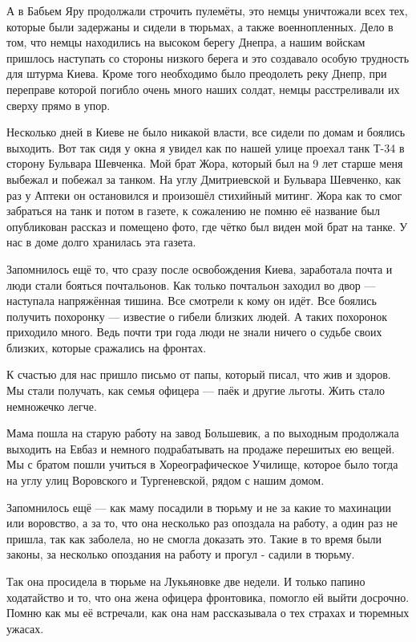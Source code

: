 А в Бабьем Яру продолжали строчить пулемёты, это немцы уничтожали всех тех,
которые были задержаны и сидели в тюрьмах, а также военнопленных.  Дело в том,
что немцы находились на высоком берегу Днепра, а нашим войскам пришлось
наступать со стороны низкого берега и это создавало особую трудность для штурма
Киева. Кроме того необходимо было преодолеть  реку Днепр, при переправе которой
погибло очень много наших солдат, немцы расстреливали их сверху прямо в упор.  

Несколько дней в Киеве не  было никакой власти, все сидели по домам и боялись
выходить.  Вот так сидя у окна я увидел как по нашей улице проехал  танк  Т-34
в сторону Бульвара Шевченка. Мой брат Жора, который был на 9 лет старше меня
выбежал и побежал за танком. На углу Дмитриевской и Бульвара Шевченко, как раз
у Аптеки он остановился  и произошёл стихийный митинг. Жора как то смог
забраться на танк и потом в газете, к сожалению не помню её название  был
опубликован рассказ и помещено фото, где чётко был виден мой брат на танке. У
нас в доме долго хранилась эта газета.

Запомнилось ещё то, что сразу после освобождения Киева, заработала почта и люди
стали бояться почтальонов.  Как только почтальон заходил во двор — наступала
напряжённая тишина. Все смотрели к кому он идёт. Все боялись получить похоронку
— известие о гибели близких людей. А таких похоронок приходило много. Ведь
почти три года люди не  знали ничего о судьбе своих близких, которые сражались
на фронтах. 

К счастью для нас пришло письмо от папы, который писал, что жив и здоров.  Мы
стали получать, как семья офицера — паёк и другие льготы. Жить стало немножечко
легче.              

Мама пошла на старую работу на завод Большевик, а по выходным продолжала
выходить на Евбаз и немного подрабатывать на продаже перешитых ею вещей. Мы с
братом пошли учиться в Хореографическое Училище, которое было тогда на углу
улиц Воровского и Тургеневской, рядом с нашим домом. 

Запомнилось ещё — как маму посадили в тюрьму и не за какие то махинации или
воровство, а за то, что она несколько раз опоздала на работу, а один раз не
пришла, так как заболела, но не смогла доказать это. Такие в то время были
законы, за несколько  опоздания на работу  и  прогул  - садили в тюрьму. 

Так она просидела в тюрьме на Лукьяновке две недели. И только папино
ходатайство и то, что она жена офицера фронтовика, помогло ей выйти  досрочно.
Помню как мы её встречали, как она нам рассказывала о тех страхах и тюремных
ужасах. 

